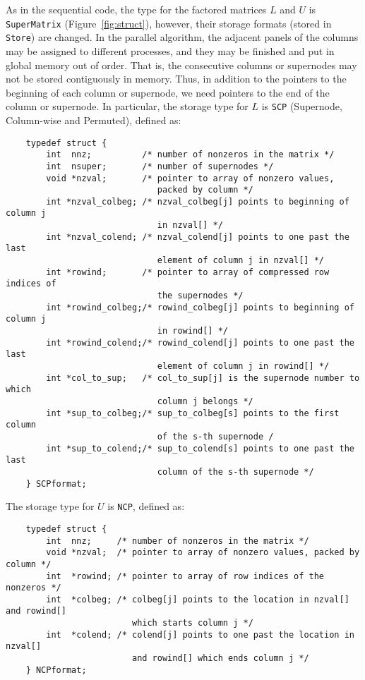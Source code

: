 As in the sequential code, the type for the factored matrices $L$ and $U$ 
is {\tt SuperMatrix} (Figure~\ref{fig:struct}), however, their storage formats
(stored in {\tt *Store}) are changed. In the parallel algorithm, the
adjacent panels of the columns may be assigned to different processes,
and they may be finished and put in global memory out of order. That is,
the consecutive columns or supernodes may not be stored contiguously
in memory. Thus, in addition to the pointers to the beginning
of each column or supernode, we need pointers to the end of
the column or supernode. In particular, the storage type for $L$ is
{\tt SCP} (Supernode, Column-wise and Permuted), defined as:

\begin{verbatim}
    typedef struct {
        int  nnz;          /* number of nonzeros in the matrix */
        int  nsuper;       /* number of supernodes */
        void *nzval;       /* pointer to array of nonzero values, 
                              packed by column */
        int *nzval_colbeg; /* nzval_colbeg[j] points to beginning of column j
                              in nzval[] */
        int *nzval_colend; /* nzval_colend[j] points to one past the last 
                              element of column j in nzval[] */
        int *rowind;       /* pointer to array of compressed row indices of 
                              the supernodes */
        int *rowind_colbeg;/* rowind_colbeg[j] points to beginning of column j
                              in rowind[] */
        int *rowind_colend;/* rowind_colend[j] points to one past the last
                              element of column j in rowind[] */
        int *col_to_sup;   /* col_to_sup[j] is the supernode number to which
                              column j belongs */
        int *sup_to_colbeg;/* sup_to_colbeg[s] points to the first column 
                              of the s-th supernode /
        int *sup_to_colend;/* sup_to_colend[s] points to one past the last
                              column of the s-th supernode */
    } SCPformat;
\end{verbatim}

The storage type for $U$ is {\tt NCP}, defined as:
\begin{verbatim}
    typedef struct {
        int  nnz;     /* number of nonzeros in the matrix */
        void *nzval;  /* pointer to array of nonzero values, packed by column */
        int  *rowind; /* pointer to array of row indices of the nonzeros */
        int  *colbeg; /* colbeg[j] points to the location in nzval[] and rowind[]
                         which starts column j */
        int  *colend; /* colend[j] points to one past the location in nzval[]
                         and rowind[] which ends column j */
    } NCPformat;
\end{verbatim}

